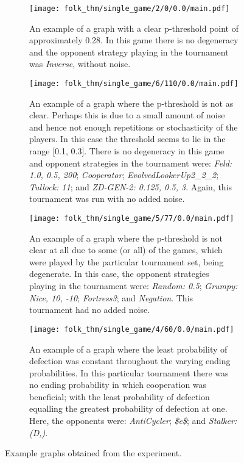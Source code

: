 \begin{figure}
    \begin{subfigure}{.45\textwidth}
        \centering
        \texttt{[image: folk\_thm/single\_game/2/0/0.0/main.pdf]}
        \caption{An example of a graph with a clear p-threshold point of approximately 0.28. In this game there is no degeneracy and the opponent strategy playing in the tournament was \textit{Inverse}, without noise.}\label{subfig:clear_thresh_plot}
    \end{subfigure}
    \begin{subfigure}{.45\textwidth}
        \centering
        \texttt{[image: folk\_thm/single\_game/6/110/0.0/main.pdf]}
        \caption{An example of a graph where the p-threshold is not as clear. Perhaps this is due to a small amount of noise and hence not enough repetitions or stochasticity of the players. In this case the threshold seems to lie in the range [0.1, 0.3]. There is no degeneracy in this game and opponent strategies in the tournament were: \textit{Feld: 1.0, 0.5, 200}; \textit{Cooperator};  \textit{EvolvedLookerUp2\_2\_2}; \textit{Tullock: 11}; and \textit{ZD-GEN-2: 0.125, 0.5, 3}. Again, this tournament was run with no added noise.}\label{subfig:unclear_thresh_plot}
    \end{subfigure}


    \newline


    \begin{subfigure}{.45\textwidth}
        \centering
        \texttt{[image: folk\_thm/single\_game/5/77/0.0/main.pdf]}
        \caption{An example of a graph where the p-threshold is not clear at all due to some (or all) of the games, which were played by the particular tournament set, being degenerate. In this case, the opponent strategies playing in the tournament were: \textit{Random: 0.5}; \textit{Grumpy: Nice, 10, -10}; \textit{Fortress3}; and \textit{Negation}. This tournament had no added noise.}\label{subfig:degenerate_plot}
    \end{subfigure}
    \begin{subfigure}{.45\textwidth}
        \centering
        \texttt{[image: folk\_thm/single\_game/4/60/0.0/main.pdf]}
        \caption{An example of a graph where the least probability of defection
        was constant throughout the varying ending probabilities. In this
        particular tournament there was no ending probability in which
        cooperation was beneficial; with the least probability of defection
        equalling the greatest probability of defection at one. Here, the
        opponents were: \textit{AntiCycler}; \textit{\$e\$}; and
        \textit{Stalker: (D,)}.}\label{subfig:constant_plot}
    \end{subfigure}
    \caption{Example graphs obtained from the experiment.}\label{fig:example_graphs}
\end{figure}

